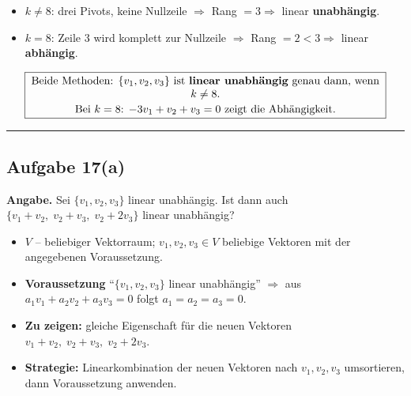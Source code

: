 \documentclass[a4paper,12pt]{article}
\begin{document}
\begin{itemize}[leftmargin=*, nosep]
\item $k \neq 8$: drei Pivots, keine Nullzeile $\Rightarrow$ Rang $= 3 \Rightarrow$ linear \textbf{unabh\"angig}.
\item $k = 8$: Zeile 3 wird komplett zur Nullzeile $\Rightarrow$ Rang $= 2 < 3 \Rightarrow$ linear \textbf{abh\"angig}.
\end{itemize}

\bigskip

\[
\fbox{\parbox{0.93\textwidth}{\centering
Beide Methoden: $\{v_1, v_2, v_3\}$ ist \textbf{linear unabh\"angig} genau dann, wenn $k \neq 8$.\\[2pt]
Bei $k = 8$: $-3 v_1 + v_2 + v_3 = 0$ zeigt die Abh\"angigkeit.
}}
\]

\bigskip
\hrule
\bigskip

\subsection*{Aufgabe 17(a)}

\textbf{Angabe.} Sei $\{v_1, v_2, v_3\}$ linear unabh\"angig. Ist dann auch $\{v_1+v_2,\; v_2+v_3,\; v_2+2v_3\}$ linear unabh\"angig?

\begin{begriffe}
\begin{itemize}[leftmargin=*, nosep]
    \item $V$ -- beliebiger Vektorraum; $v_1, v_2, v_3 \in V$ beliebige Vektoren mit der angegebenen Voraussetzung.
    \item \textbf{Voraussetzung} ``$\{v_1, v_2, v_3\}$ linear unabh\"angig'' $\Rightarrow$ aus $a_1 v_1 + a_2 v_2 + a_3 v_3 = 0$ folgt $a_1 = a_2 = a_3 = 0$.
    \item \textbf{Zu zeigen:} gleiche Eigenschaft f\"ur die neuen Vektoren $v_1+v_2,\; v_2+v_3,\; v_2+2v_3$.
    \item \textbf{Strategie:} Linearkombination der neuen Vektoren nach $v_1, v_2, v_3$ umsortieren, dann Voraussetzung anwenden.
\end{itemize}
\end{begriffe}
\end{document}
